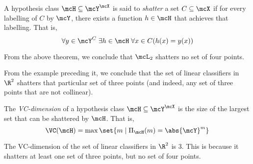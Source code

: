 \begin{definition}[Shattering] \label{def:svm:vc:shattering}
    A hypothesis class $\mcH \subseteq \mcY^\mcX$ is said to \emph{shatter}
    a set $C \subseteq \mcX$ if for every labelling of $C$ by $\mcY$,
    there exists a function $h \in \mcH$ that achieves that labelling.
    That is, \[
        \forall y \in \mcY^C \;\exists h \in \mcH
            \;\forall x \in C (h(x) = y(x))
    \]
\end{definition}
\begin{example}
    From the above theorem, we conclude that $\mcL_2$ shatters no set of
    four points.

    From the example preceding it, we conclude that the set of linear
    classifiers in $\R^2$ shatters that particular set of three points
    (and indeed, any set of three points that are not collinear).
\end{example}

\begin{definition*}[VC-dimension] \label{def:svm:vc}
    The \emph{VC-dimension} of a hypothesis class $\mcH \subseteq \mcY^\mcX$
    is the size of the largest set that can be shattered by $\mcH$.
    That is, \[
        \VC(\mcH) = \max\set{m \mid \Pi_\mcH(m) = \abs{\mcY}^m}
    \]
\end{definition*}
\begin{example}
    The VC-dimension of the set of linear classifiers in $\R^2$ is $3$.
    This is because it shatters at least one set of three points,
    but no set of four points.
\end{example}

